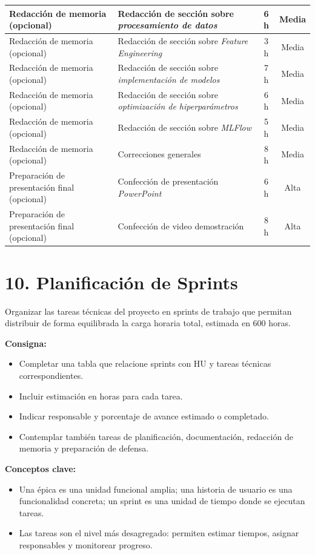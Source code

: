 \documentclass[
11pt, %
]{charter}
\begin{document}
\begin{xltabular}{\linewidth}{@{}|X|X|c|c|@{}}
Redacción de memoria (opcional) & Redacción de sección sobre \textit{procesamiento de datos} & 6 h & Media \\ \hline
Redacción de memoria (opcional) & Redacción de sección sobre \textit{Feature Engineering} & 3 h & Media \\ \hline
Redacción de memoria (opcional) & Redacción de sección sobre \textit{implementación de modelos} & 7 h & Media \\ \hline
Redacción de memoria (opcional) & Redacción de sección sobre \textit{optimización de hiperparámetros} & 6 h & Media \\ \hline
Redacción de memoria (opcional) & Redacción de sección sobre \textit{MLFlow} & 5 h & Media \\ \hline
Redacción de memoria (opcional) & Correcciones generales & 8 h & Media \\ \hline
Preparación de presentación final (opcional) & Confección de presentación \textit{PowerPoint} & 6 h & Alta \\ \hline
Preparación de presentación final (opcional) & Confección de video demostración & 8 h & Alta \\ \hline
\end{xltabular}

\section{10. Planificación de Sprints}

Organizar las tareas técnicas del proyecto en sprints de trabajo que permitan distribuir de forma equilibrada la carga horaria total, estimada en 600 horas.

\textbf{Consigna:}
\begin{itemize}
  \item Completar una tabla que relacione sprints con HU y tareas técnicas correspondientes.
  \item Incluir estimación en horas para cada tarea.
  \item Indicar responsable y porcentaje de avance estimado o completado.
  \item Contemplar también tareas de planificación, documentación, redacción de memoria y preparación de defensa.
\end{itemize}

\textbf{Conceptos clave:}
\begin{itemize}
  \item Una \'{e}pica es una unidad funcional amplia; una historia de usuario es una funcionalidad concreta; un sprint es una unidad de tiempo donde se ejecutan tareas.
  \item Las tareas son el nivel más desagregado: permiten estimar tiempos, asignar responsables y monitorear progreso.
\end{itemize}
\end{document}
